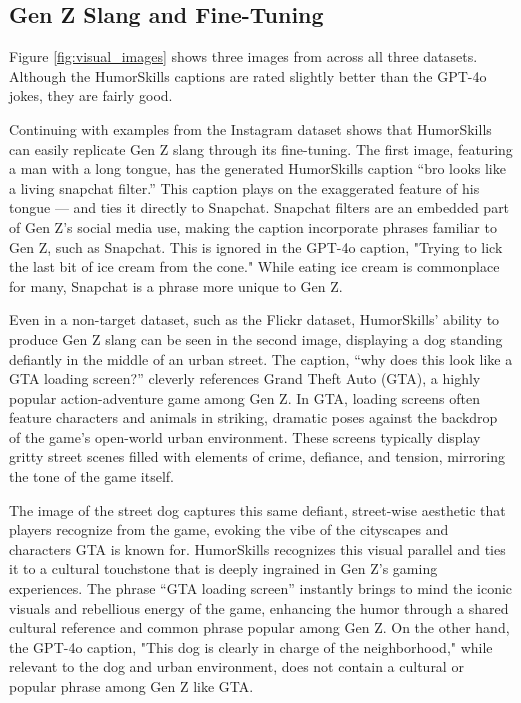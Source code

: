 \subsection{Gen Z Slang and Fine-Tuning}
Figure \ref{fig:visual_images} shows three images from across all three datasets. Although the HumorSkills captions are rated slightly better than the GPT-4o jokes, they are fairly good.

Continuing with examples from the Instagram dataset shows that HumorSkills can easily replicate Gen Z slang through its fine-tuning. The first image, featuring a man with a long tongue, has the generated HumorSkills caption “bro looks like a living snapchat filter.” This caption plays on the exaggerated feature of his tongue — and ties it directly to Snapchat. Snapchat filters are an embedded part of Gen Z’s social media use, making the caption incorporate phrases familiar to Gen Z, such as Snapchat. This is ignored in the GPT-4o caption, "Trying to lick the last bit of ice cream from the cone." While eating ice cream is commonplace for many, Snapchat is a phrase more unique to Gen Z.

Even in a non-target dataset, such as the Flickr dataset, HumorSkills’ ability to produce Gen Z slang can be seen in the second image, displaying a dog standing defiantly in the middle of an urban street. The caption, “why does this look like a GTA loading screen?” cleverly references Grand Theft Auto (GTA), a highly popular action-adventure game among Gen Z. In GTA, loading screens often feature characters and animals in striking, dramatic poses against the backdrop of the game’s open-world urban environment. These screens typically display gritty street scenes filled with elements of crime, defiance, and tension, mirroring the tone of the game itself.

The image of the street dog captures this same defiant, street-wise aesthetic that players recognize from the game, evoking the vibe of the cityscapes and characters GTA is known for. HumorSkills recognizes this visual parallel and ties it to a cultural touchstone that is deeply ingrained in Gen Z’s gaming experiences. The phrase “GTA loading screen” instantly brings to mind the iconic visuals and rebellious energy of the game, enhancing the humor through a shared cultural reference and common phrase popular among Gen Z. On the other hand, the GPT-4o caption, "This dog is clearly in charge of the neighborhood," while relevant to the dog and urban environment, does not contain a cultural or popular phrase among Gen Z like GTA.

